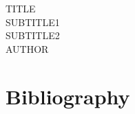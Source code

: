 \documentclass[a4paper,11pt]{report}
\begin{document}
\setlength{\extrarowheight}{3pt}

\begin{titlepage}
    \begin{center}
        \vspace*{8cm}
        \Huge{TITLE} \\
        \vspace{0.4cm}
        \Large{SUBTITLE1} \\
        \vspace*{0.4cm}
        \large{SUBTITLE2} \\
        \vspace*{0.4cm}
        \small{AUTHOR} \\
    \end{center}
\end{titlepage}

\tableofcontents
\newpage

\section{Bibliography}{
}
\end{document}
